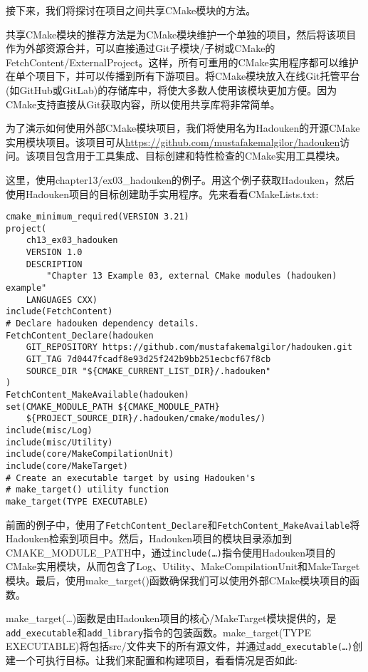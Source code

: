 接下来，我们将探讨在项目之间共享CMake模块的方法。


共享CMake模块的推荐方法是为CMake模块维护一个单独的项目，然后将该项目作为外部资源合并，可以直接通过Git子模块/子树或CMake的FetchContent/ExternalProject。这样，所有可重用的CMake实用程序都可以维护在单个项目下，并可以传播到所有下游项目。将CMake模块放入在线Git托管平台(如GitHub或GitLab)的存储库中，将使大多数人使用该模块更加方便。因为CMake支持直接从Git获取内容，所以使用共享库将非常简单。

为了演示如何使用外部CMake模块项目，我们将使用名为Hadouken的开源CMake实用模块项目。该项目可从\url{https://github.com/mustafakemalgilor/hadouken}访问。该项目包含用于工具集成、目标创建和特性检查的CMake实用工具模块。

这里，使用chapter13/ex03\_hadouken的例子。用这个例子获取Hadouken，然后使用Hadouken项目的目标创建助手实用程序。先来看看CMakeLists.txt:

\begin{lstlisting}[style=styleCMake]
cmake_minimum_required(VERSION 3.21)
project(
	ch13_ex03_hadouken
	VERSION 1.0
	DESCRIPTION
		"Chapter 13 Example 03, external CMake modules (hadouken) example"
	LANGUAGES CXX)
include(FetchContent)
# Declare hadouken dependency details.
FetchContent_Declare(hadouken
	GIT_REPOSITORY https://github.com/mustafakemalgilor/hadouken.git
	GIT_TAG 7d0447fcadf8e93d25f242b9bb251ecbcf67f8cb
	SOURCE_DIR "${CMAKE_CURRENT_LIST_DIR}/.hadouken"
)
FetchContent_MakeAvailable(hadouken)
set(CMAKE_MODULE_PATH ${CMAKE_MODULE_PATH}
	${PROJECT_SOURCE_DIR}/.hadouken/cmake/modules/)
include(misc/Log)
include(misc/Utility)
include(core/MakeCompilationUnit)
include(core/MakeTarget)
# Create an executable target by using Hadouken's
# make_target() utility function
make_target(TYPE EXECUTABLE)
\end{lstlisting}

前面的例子中，使用了\texttt{FetchContent\_Declare}和\texttt{FetchContent\_MakeAvailable}将Hadouken检索到项目中。然后，Hadouken项目的模块目录添加到CMAKE\_MODULE\_PATH中，通过\texttt{include(…)}指令使用Hadouken项目的CMake实用模块，从而包含了Log、Utility、MakeCompilationUnit和MakeTarget模块。最后，使用make\_target()函数确保我们可以使用外部CMake模块项目的函数。

make\_target(…)函数是由Hadouken项目的核心/MakeTarget模块提供的，是\texttt{add\_executable}和\texttt{add\_library}指令的包装函数。make\_target(TYPE EXECUTABLE)将包括src/文件夹下的所有源文件，并通过\texttt{add\_executable(…)}创建一个可执行目标。让我们来配置和构建项目，看看情况是否如此:

